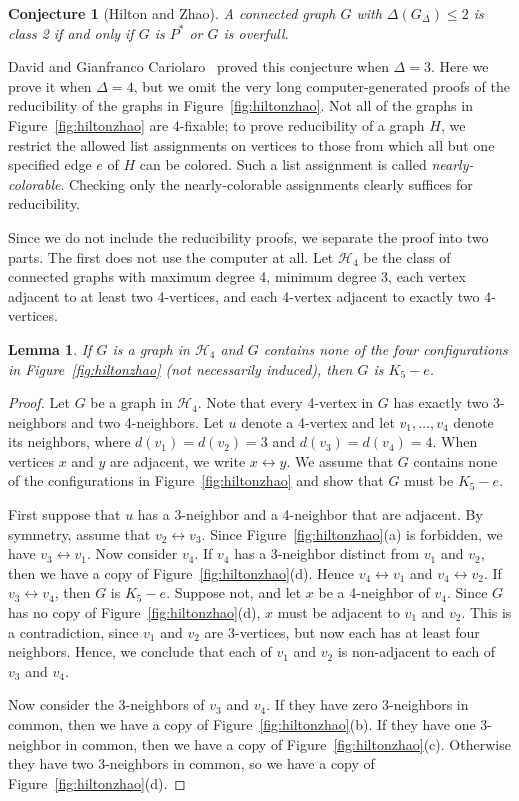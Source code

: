 \documentclass[12pt]{article}
\theoremstyle{plain}
\newtheorem{lem}[thm]{Lemma}
\newtheorem{conjecture}[thm]{Conjecture}
\theoremstyle{definition}
\theoremstyle{remark}
\newcommand{\fancy}[1]{\mathcal{#1}}
\def\adj{\leftrightarrow}
\def\H{\fancy{H}}
\def\adj{\leftrightarrow}
\begin{document}
\begin{conjecture}[Hilton and Zhao]
A connected graph $G$ with $\Delta(G_\Delta) \le 2$ is class 2 if and only if
$G$ is $P^*$ or $G$ is overfull.
\end{conjecture}

David and Gianfranco Cariolaro~\cite{cariolaro2003colouring} proved this
conjecture when $\Delta=3$.  Here we prove it when $\Delta=4$, but we
omit the very long computer-generated proofs of the reducibility of the
graphs in Figure~\ref{fig:hiltonzhao}.  Not all of the graphs in
Figure~\ref{fig:hiltonzhao} are $4$-fixable; to prove reducibility of a graph
$H$, we restrict the allowed list assignments on vertices to those from which
all but one specified edge $e$ of $H$ can be colored.  Such a list assignment
is called \emph{nearly-colorable}.  Checking only the nearly-colorable
assignments clearly suffices for reducibility.


Since we do not include the reducibility proofs, we separate the proof into two parts.  The first does not use the computer at all.
Let $\H_4$ be the class of connected graphs with maximum degree 4, minimum
degree 3, each vertex adjacent to at least two 4-vertices, and each 4-vertex
adjacent to exactly two 4-vertices.
\begin{lem}\label{HiltonZhaoLemma}
If $G$ is a graph in $\H_4$ and $G$ contains none of the four configurations in
Figure~\ref{fig:hiltonzhao} (not necessarily induced), then $G$ is $K_5-e$.
\end{lem}
\begin{proof}
Let $G$ be a graph in $\H_4$.  Note that every 4-vertex in $G$ has exactly two
3-neighbors and two 4-neighbors.  Let $u$ denote a 4-vertex and let
$v_1,\ldots,v_4$ denote its neighbors, where $d(v_1)=d(v_2)=3$ and $d(v_3)=d(v_4)=4$.
When vertices $x$ and $y$ are adjacent, we write $x\adj y$.  We assume that $G$
contains none of the configurations in Figure~\ref{fig:hiltonzhao} and show that
$G$ must be $K_5-e$.  
	
First suppose that $u$ has a 3-neighbor and a 4-neighbor that are adjacent.  By
symmetry, assume that $v_2\adj v_3$.  Since
Figure~\ref{fig:hiltonzhao}(a) is forbidden, we have $v_3\adj v_1$. 
Now consider $v_4$.  If $v_4$ has a 3-neighbor distinct from $v_1$ and $v_2$,
then we have a copy of Figure~\ref{fig:hiltonzhao}(d).  Hence $v_4\adj v_1$ and
$v_4\adj v_2$.  If $v_3\adj v_4$, then $G$ is $K_5-e$.  Suppose not, and let
$x$ be a 4-neighbor of $v_4$.  Since $G$ has no copy of
Figure~\ref{fig:hiltonzhao}(d), $x$ must be adjacent to $v_1$ and $v_2$.  This
is a contradiction, since $v_1$ and $v_2$ are 3-vertices, but now each has at
least four neighbors.  Hence, we conclude that each of $v_1$ and $v_2$ is
non-adjacent to each of $v_3$ and $v_4$.
	
Now consider the 3-neighbors of $v_3$ and $v_4$.  If they have zero 3-neighbors
in common, then we have a copy of Figure~\ref{fig:hiltonzhao}(b).  If they have
one 3-neighbor in common, then we have a copy of
Figure~\ref{fig:hiltonzhao}(c).  Otherwise they have two 3-neighbors in common,
so we have a copy of Figure~\ref{fig:hiltonzhao}(d).  
\end{proof}
\end{document}
